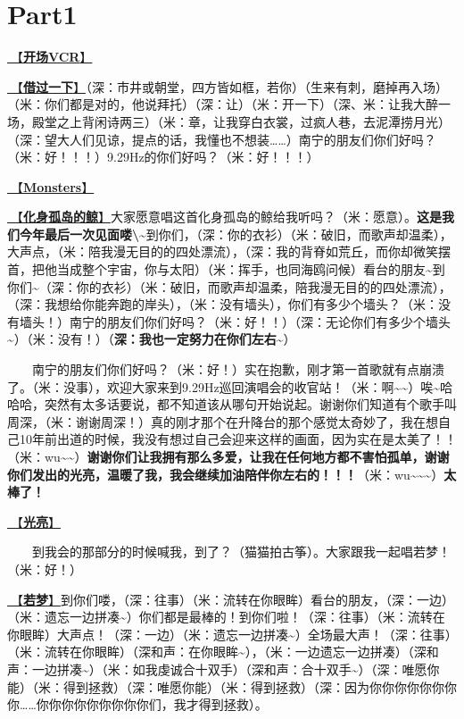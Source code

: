 \documentclass[]{ctexbook}
\begin{document}
\newpage

\section{Part1}\label{nanning-20241207-part1}

\hyperref[opening-vcr]{🎥【\textbf{开场VCR}】}

\hyperref[I-will-go-my-way]{🎵【\textbf{借过一下}】}（深：市井或朝堂，四方皆如框，若你）（生来有刺，磨掉再入场）（米：你们都是对的，他说拜托）（深：让）（米：开一下）（深、米：让我大醉一场，殿堂之上背闲诗两三）（米：章，让我穿白衣裳，过疯人巷，去泥潭捞月光）（深：望大人们见谅，提点的话，我懂也不想装\ldots\ldots）南宁的朋友们你们好吗？（米：好！！！）9.29Hz的你们好吗？（米：好！！！）

\hyperref[Monsters]{🎵【\textbf{Monsters}】}

\hyperref[hua-shen-gu-dao-de-jing]{🎵【\textbf{化身孤岛的鲸}】}大家愿意唱这首化身孤岛的鲸给我听吗？（米：愿意）。\textbf{这是我们今年最后一次见面喽\textbackslash\textasciitilde{}}到你们，（深：你的衣衫）（米：破旧，而歌声却温柔），大声点，（米：陪我漫无目的的四处漂流），（深：我的背脊如荒丘，而你却微笑摆首，把他当成整个宇宙，你与太阳）（米：挥手，也同海鸥问候）看台的朋友\textasciitilde 到你们\textasciitilde（深：你的衣衫）（米：破旧，而歌声却温柔，陪我漫无目的的四处漂流），（深：我想给你能奔跑的岸头），（米：没有墙头），你们有多少个墙头？（米：没有墙头！）南宁的朋友们你们好吗？（米：好！！）（深：无论你们有多少个墙头\textasciitilde）（米：没有！）（\textbf{深：我也一定努力在你们左右\textasciitilde{}}）

  南宁的朋友们你们好吗？（米：好！）实在抱歉，刚才第一首歌就有点崩溃了。（米：没事），欢迎大家来到9.29Hz巡回演唱会的收官站！（米：啊\textasciitilde\textasciitilde）唉\textasciitilde 哈哈哈，突然有太多话要说，都不知道该从哪句开始说起。谢谢你们知道有个歌手叫周深，（米：谢谢周深！）真的刚才那个在升降台的那个感觉太奇妙了，我在想自己10年前出道的时候，我没有想过自己会迎来这样的画面，因为实在是太美了！！（米：wu\textasciitilde\textasciitilde）\textbf{谢谢你们让我拥有那么多爱，让我在任何地方都不害怕孤单，谢谢你们发出的光亮，温暖了我，我会继续加油陪伴你左右的！！！}（米：wu\textasciitilde\textasciitilde\textasciitilde）\textbf{太棒了！}

\hyperref[silver-linings]{🎵【\textbf{光亮}】}

  到我会的那部分的时候喊我，到了？（猫猫拍古筝）。大家跟我一起唱若梦！（米：好！）

\hyperref[ruomeng]{🎵【\textbf{若梦}】}到你们喽，（深：往事）（米：流转在你眼眸）看台的朋友，（深：一边）（米：遗忘一边拼凑\textasciitilde）你们都是最棒的！到你们啦！（深：往事）（米：流转在你眼眸）大声点！（深：一边）（米：遗忘一边拼凑\textasciitilde）全场最大声！（深：往事）（米：流转在你眼眸）（深和声：在你眼眸\textasciitilde），（米：一边遗忘一边拼凑）（深和声：一边拼凑\textasciitilde）（米：如我虔诚合十双手）（深和声：合十双手\textasciitilde）（深：唯愿你能）（米：得到拯救）（深：唯愿你能）（米：得到拯救）（深：因为你你你你你你你你\ldots\ldots 你你你你你你你你你们，我才得到拯救）。
\end{document}
